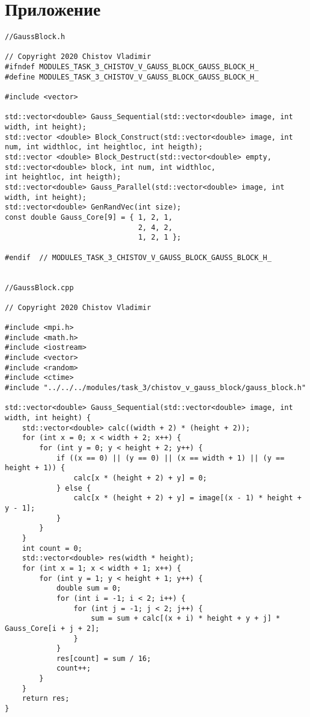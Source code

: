 \documentclass{report}
\begin{document}
\section*{Приложение}
\begin{lstlisting}
//GaussBlock.h

// Copyright 2020 Chistov Vladimir
#ifndef MODULES_TASK_3_CHISTOV_V_GAUSS_BLOCK_GAUSS_BLOCK_H_
#define MODULES_TASK_3_CHISTOV_V_GAUSS_BLOCK_GAUSS_BLOCK_H_

#include <vector>

std::vector<double> Gauss_Sequential(std::vector<double> image, int width, int height);
std::vector <double> Block_Construct(std::vector<double> image, int num, int widthloc, int heightloc, int heigth);
std::vector <double> Block_Destruct(std::vector<double> empty, std::vector<double> block, int num, int widthloc,
int heightloc, int heigth);
std::vector<double> Gauss_Parallel(std::vector<double> image, int width, int height);
std::vector<double> GenRandVec(int size);
const double Gauss_Core[9] = { 1, 2, 1,
                               2, 4, 2,
                               1, 2, 1 };

#endif  // MODULES_TASK_3_CHISTOV_V_GAUSS_BLOCK_GAUSS_BLOCK_H_


//GaussBlock.cpp

// Copyright 2020 Chistov Vladimir

#include <mpi.h>
#include <math.h>
#include <iostream>
#include <vector>
#include <random>
#include <ctime>
#include "../../../modules/task_3/chistov_v_gauss_block/gauss_block.h"

std::vector<double> Gauss_Sequential(std::vector<double> image, int width, int height) {
    std::vector<double> calc((width + 2) * (height + 2));
    for (int x = 0; x < width + 2; x++) {
        for (int y = 0; y < height + 2; y++) {
            if ((x == 0) || (y == 0) || (x == width + 1) || (y == height + 1)) {
                calc[x * (height + 2) + y] = 0;
            } else {
                calc[x * (height + 2) + y] = image[(x - 1) * height + y - 1];
            }
        }
    }
    int count = 0;
    std::vector<double> res(width * height);
    for (int x = 1; x < width + 1; x++) {
        for (int y = 1; y < height + 1; y++) {
            double sum = 0;
            for (int i = -1; i < 2; i++) {
                for (int j = -1; j < 2; j++) {
                    sum = sum + calc[(x + i) * height + y + j] * Gauss_Core[i + j + 2];
                }
            }
            res[count] = sum / 16;
            count++;
        }
    }
    return res;
}


\end{lstlisting}
\end{document}
